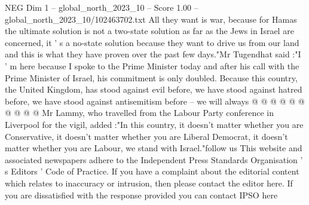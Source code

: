\begin{textsample}{NEG Dim 1 – global\_north\_2023\_10 – Score 1.00 – global\_north\_2023\_10/102463702.txt}
All they want is war, because for Hamas the ultimate solution is not a two-state solution as far as the Jews in Israel are concerned, it ' s a no-state solution because they want to drive us from our land and this is what they have proven over the past few days."Mr Tugendhat said :"I ' m here because I spoke to the Prime Minister today and after his call with the Prime Minister of Israel, his commitment is only doubled.
Because this country, the United Kingdom, has stood against evil before, we have stood against hatred before, we have stood against antisemitism before -- we will always @ @ @ @ @ @ @ @ @ @ Mr Lammy, who travelled from the Labour Party conference in Liverpool for the vigil, added :"In this country, it doesn't matter whether you are Conservative, it doesn't matter whether you are Liberal Democrat, it doesn't matter whether you are Labour, we stand with Israel."follow us This website and associated newspapers adhere to the Independent Press Standards Organisation ' s Editors ' Code of Practice.
If you have a complaint about the editorial content which relates to inaccuracy or intrusion, then please contact the editor here.
If you are dissatisfied with the response provided you can contact IPSO here

\end{textsample}
